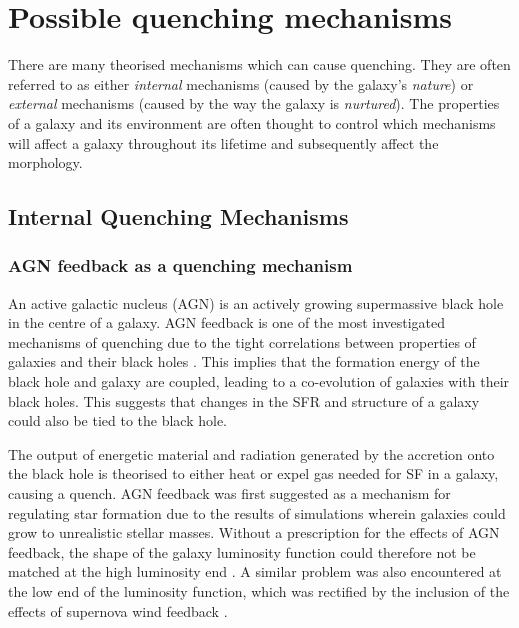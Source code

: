 \section{Possible quenching mechanisms}\label{sec:quenchmech}

There are many theorised mechanisms which can cause quenching. They are often referred to as either \emph{internal} mechanisms (caused by the galaxy's \emph{nature}) or \emph{external} mechanisms (caused by the way the galaxy is \emph{nurtured}). The properties of a galaxy and its environment are often thought to control which mechanisms will affect a galaxy throughout its lifetime and subsequently affect the morphology. 

\subsection{Internal Quenching Mechanisms}\label{sec:intquench}

\subsubsection{AGN feedback as a quenching mechanism}\label{sec:agnquench}

An active galactic nucleus (AGN) is an actively growing supermassive black hole in the centre of a galaxy. AGN feedback is one of the most investigated mechanisms of quenching due to the tight correlations between properties of galaxies and their black holes \citep{magorrian98, marconi03, haringrix04}. This implies that the formation energy of the black hole and galaxy are coupled, leading to a co-evolution of galaxies with their black holes. This suggests that changes in the SFR and structure of a galaxy could also be tied to the black hole. 

The output of energetic material and radiation generated by the accretion onto the black hole is theorised to either heat or expel gas needed for SF in a galaxy, causing a quench. AGN feedback was first suggested as a mechanism for regulating star formation due to the results of simulations \citep{silk98, Bower06, Croton06, somerville08} wherein galaxies could grow to unrealistic stellar masses. Without a prescription for the effects of AGN feedback, the shape of the galaxy luminosity function could therefore not be matched at the high luminosity end \citep{baugh98, baugh05, kauffmann99a, kauffmann99b, somerville01, kitzbichler06}. A similar problem was also encountered at the low end of the luminosity function, which was rectified by the inclusion of the effects of supernova wind feedback \citep{dekel86, powell11}.

